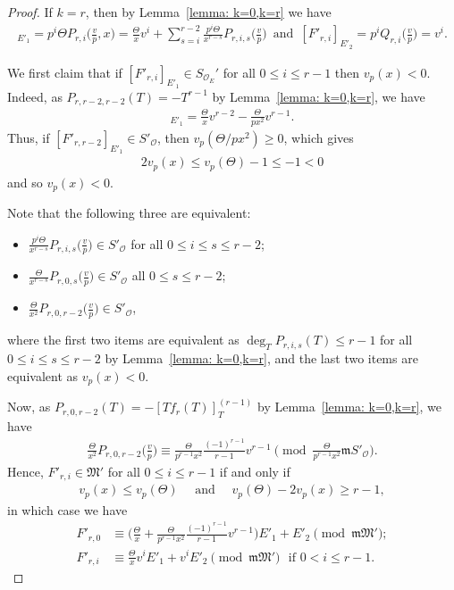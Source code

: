 \documentclass[11pt]{amsart}
\theoremstyle{definition}
\numberwithin{equation}{subsection}
\theoremstyle{plain}
\theoremstyle{plain}
\theoremstyle{plain}
\theoremstyle{plain}
\theoremstyle{plain}
\theoremstyle{plain}
\theoremstyle{plain}
\theoremstyle{plain}
\theoremstyle{plain}
\theoremstyle{plain}
\theoremstyle{plain}
\theoremstyle{plain}
\theoremstyle{definition}
\theoremstyle{definition}
\theoremstyle{definition}
\theoremstyle{remark}
\renewcommand{\(}{\textup{(}}
\renewcommand{\)}{\textup{)}}
\newcommand{\SBr}{S_{\mathcal{O}_E}}
\newcommand{\fM}{\mathfrak{M}}
\newcommand{\fm}{\mathfrak{m}}
\newcommand{\cO}{\mathcal{O}}
\begin{document}
\begin{proof}
If $k=r$, then by Lemma~\ref{lemma: k=0,k=r} we have
\begin{align*}
[F'_{r,i}]_{E'_1}
    =p^i\Theta P_{r,i}\Big(\frac{v}{p},x\Big)
    =\frac{\Theta}{x}v^i+\sum_{s=i}^{r-2}\frac{p^i\Theta}{x^{r-s}}P_{r,i,s}\Big(\frac{v}{p}\Big)\,\mbox{ and }\,
[F'_{r,i}]_{E'_2}
    =p^iQ_{r,i}\Big(\frac{v}{p}\Big)
    =v^i.
\end{align*}

We first claim that if $[F'_{r,i}]_{E'_1}\in\SBr'$ for all $0\leq i\leq r-1$ then $v_p(x)<0$. Indeed, as $P_{r,r-2,r-2}(T)=-T^{r-1}$ by Lemma~\ref{lemma: k=0,k=r}, we have
\begin{align*}
    [F'_{r,r-2}]_{E'_1}=\frac{\Theta}{x}v^{r-2}-\frac{\Theta}{px^2}v^{r-1}.
\end{align*}
Thus, if $[F'_{r,r-2}]_{E'_1}\in S'_\cO$, then $v_p(\Theta/px^2)\geq 0$, which gives
\begin{align*}
    2v_p(x)\leq v_p(\Theta)-1\leq -1<0
\end{align*}
and so $v_p(x)<0$.

Note that the following three are equivalent:
\begin{itemize}[leftmargin=*]
\item $\frac{p^i\Theta}{x^{r-s}}P_{r,i,s}\big(\frac{v}{p}\big)\in S'_\cO$ for all $0\leq i\leq s\leq r-2$;
\item $\frac{\Theta}{x^{r-s}}P_{r,0,s}\big(\frac{v}{p}\big)\in S'_\cO$ all $0\leq s\leq r-2$;
\item $\frac{\Theta}{x^{2}}P_{r,0,r-2}\big(\frac{v}{p}\big)\in S'_\cO$,
\end{itemize}
where the first two items are equivalent as $\deg_T P_{r,i,s}(T)\leq r-1$ for all $0\leq i\leq s\leq r-2$ by Lemma~\ref{lemma: k=0,k=r}, and the last two items are equivalent as $v_p(x)<0$.


Now, as $P_{r,0,r-2}(T)=-[Tf_r(T)]^{(r-1)}_T$ by Lemma~\ref{lemma: k=0,k=r}, we have
\begin{align*}
    \frac{\Theta}{x^{2}}P_{r,0,r-2}\Big(\frac{v}{p}\Big)
    \equiv
    \frac{\Theta}{p^{r-1}x^2}\frac{(-1)^{r-1}}{r-1}v^{r-1}
    \pmod{\frac{\Theta}{p^{r-1}x^{2}}\fm S'_\cO}.
\end{align*}
Hence, $F'_{r,i}\in\fM'$ for all $0\leq i\leq r-1$ if and only if
\begin{align*}
    v_p(x)\leq v_p(\Theta)
    \quad\mbox{ and }\quad
    v_p(\Theta)-2v_p(x)\geq r-1,
\end{align*}
in which case we have
\begin{align*}
F'_{r,0}
    &\equiv
    \bigg(\frac{\Theta}{x}+\frac{\Theta}{p^{r-1}x^2}\frac{(-1)^{r-1}}{r-1}v^{r-1}\bigg)E'_1 +E'_2 \pmod{\fm\fM'};
    \\
F'_{r,i}  &\equiv
    \frac{\Theta}{x}v^iE'_1
    +v^iE'_2 \pmod{\fm\fM'}\,\,\mbox{ if }0<i\leq r-1.
\end{align*}



\end{proof}
\end{document}
